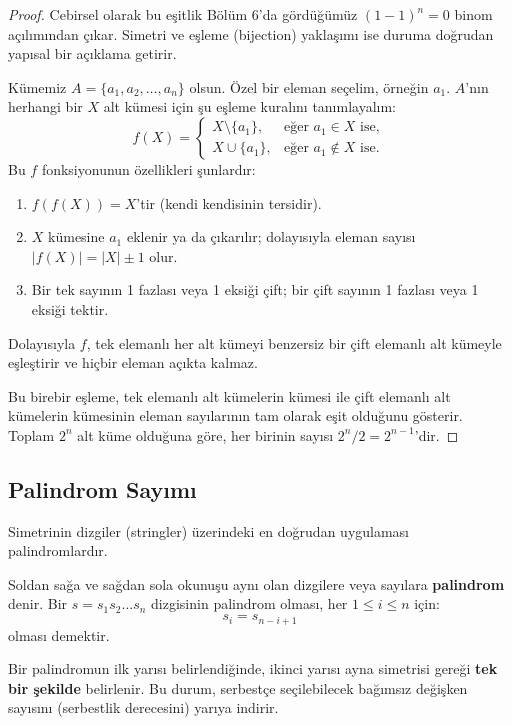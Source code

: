 \begin{proof}
Cebirsel olarak bu eşitlik Bölüm 6'da gördüğümüz $(1 - 1)^n = 0$ binom açılımından çıkar. Simetri ve eşleme (bijection) yaklaşımı ise duruma doğrudan yapısal bir açıklama getirir.

Kümemiz $A = \{a_1, a_2, \dots, a_n\}$ olsun. Özel bir eleman seçelim, örneğin $a_1$.
$A$'nın herhangi bir $X$ alt kümesi için şu eşleme kuralını tanımlayalım:
\[
f(X) = \begin{cases} 
X \setminus \{a_1\}, & \text{eğer } a_1 \in X \text{ ise}, \\
X \cup \{a_1\}, & \text{eğer } a_1 \notin X \text{ ise}.
\end{cases}
\]
Bu $f$ fonksiyonunun özellikleri şunlardır:
\begin{enumerate}
    \item $f(f(X)) = X$'tir (kendi kendisinin tersidir).
    \item $X$ kümesine $a_1$ eklenir ya da çıkarılır; dolayısıyla eleman sayısı $|f(X)| = |X| \pm 1$ olur.
    \item Bir tek sayının 1 fazlası veya 1 eksiği çift; bir çift sayının 1 fazlası veya 1 eksiği tektir.
\end{enumerate}
Dolayısıyla $f$, tek elemanlı her alt kümeyi benzersiz bir çift elemanlı alt kümeyle eşleştirir ve hiçbir eleman açıkta kalmaz.

Bu birebir eşleme, tek elemanlı alt kümelerin kümesi ile çift elemanlı alt kümelerin kümesinin eleman sayılarının tam olarak eşit olduğunu gösterir. Toplam $2^n$ alt küme olduğuna göre, her birinin sayısı $2^n / 2 = 2^{n-1}$'dir.
\end{proof}

\subsection{Palindrom Sayımı}

Simetrinin dizgiler (stringler) üzerindeki en doğrudan uygulaması palindromlardır.

\begin{definition}[Palindrom]
Soldan sağa ve sağdan sola okunuşu aynı olan dizgilere veya sayılara \textbf{palindrom} denir. Bir $s = s_1 s_2 \dots s_n$ dizgisinin palindrom olması, her $1 \le i \le n$ için:
\[
s_i = s_{n - i + 1}
\]
olması demektir.
\end{definition}

Bir palindromun ilk yarısı belirlendiğinde, ikinci yarısı ayna simetrisi gereği \textbf{tek bir şekilde} belirlenir. Bu durum, serbestçe seçilebilecek bağımsız değişken sayısını (serbestlik derecesini) yarıya indirir.


